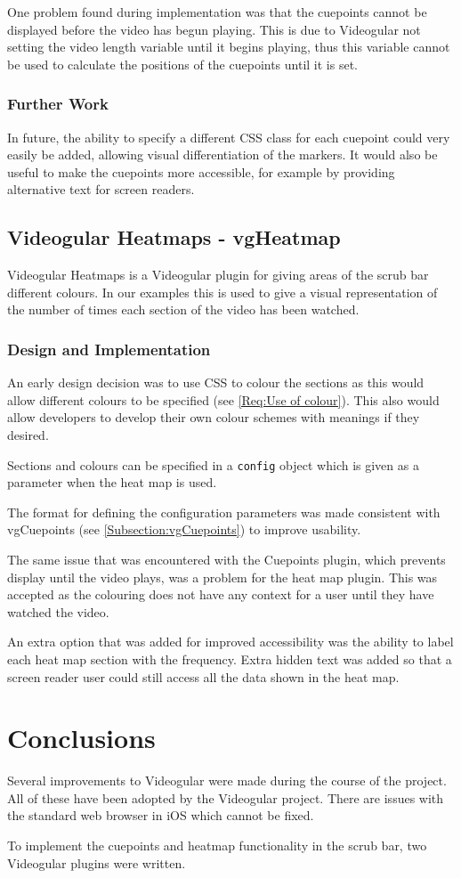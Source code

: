 One problem found during implementation was that the cuepoints cannot be displayed before the video has begun playing. This is due to \gls{Videogular} not setting the video length variable until it begins playing, thus this variable cannot be used to calculate the positions of the cuepoints until it is set.

\subsubsection{Further Work}
In future, the ability to specify a different \gls{CSS} class for each cuepoint could very easily be added, allowing visual differentiation of the markers. It would also be useful to make the cuepoints more accessible, for example by providing alternative text for screen readers.

\subsection{Videogular Heatmaps - vgHeatmap}
\gls{Videogular} Heatmaps is a \gls{Videogular} plugin for giving areas of the scrub bar different colours. In our examples this is used to give a visual representation of the number of times each section of the video has been watched.

\subsubsection{Design and Implementation}
An early design decision was to use \gls{CSS} to colour the sections as this would allow different colours to be specified (see \cref{Req:Use of colour}). This also would allow developers to develop their own colour schemes with meanings if they desired.

Sections and colours can be specified in a \texttt{config} object which is given as a parameter when the heat map is used.

The format for defining the configuration parameters was made consistent with vgCuepoints (see \autoref{Subsection:vgCuepoints}) to improve usability.

The same issue that was encountered with the Cuepoints plugin, which prevents display until the video plays, was a problem for the heat map plugin. This was accepted as the colouring does not have any context for a user until they have watched the video.

An extra option that was added for improved accessibility was the ability to label each heat map section with the frequency. Extra hidden text was added so that a screen reader user could still access all the data shown in the heat map.

\section{Conclusions}

Several improvements to Videogular were made during the course of the project. All of these have been adopted by the Videogular project. There are issues with the standard web browser in iOS which cannot be fixed.

To implement the cuepoints and heatmap functionality in the scrub bar, two Videogular plugins were written.

